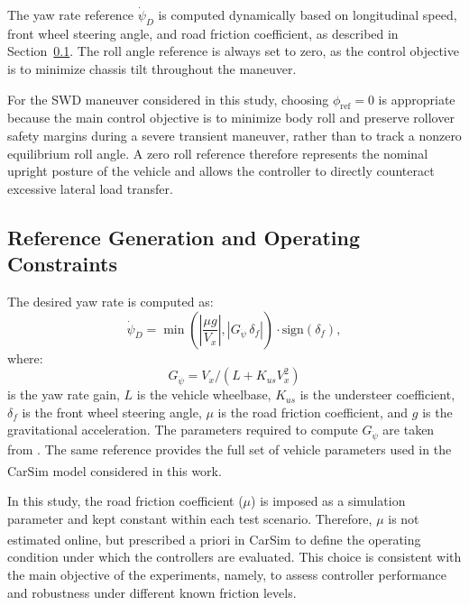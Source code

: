 \documentclass[sn-chicago,iicol]{sn-jnl}
\theoremstyle{thmstyleone}%
\theoremstyle{thmstyletwo}%
\theoremstyle{thmstylethree}%
\begin{document}
The yaw rate reference $\dot{\psi}_D$ is computed dynamically based on 
longitudinal speed, front wheel steering angle, and road friction coefficient, 
as described in Section~\ref{sec:references}. The roll angle reference is 
always set to zero, as the control objective is to minimize chassis tilt 
throughout the maneuver.

For the SWD maneuver considered in this study, choosing $\phi_{\mathrm{ref}} = 0$ is appropriate because the main control objective is to minimize body roll and preserve rollover safety margins during a severe transient maneuver, rather than to track a nonzero equilibrium roll angle. A zero roll reference therefore represents the nominal upright posture of the vehicle and allows the controller to directly counteract excessive lateral load transfer.


\subsection{Reference Generation and Operating 
            Constraints}\label{sec:references}

The desired yaw rate is computed as:
\begin{equation}
    \dot{\psi}_D = \min\left(\left|\frac{\mu g}{V_x}\right|, 
    \left|G_{\dot{\psi}}\,\delta_f\right|\right) 
    \cdot \mathrm{sign}(\delta_f),
    \label{Eq:yaw_ref}
\end{equation}
\noindent where:
\begin{equation}
    G_{\dot{\psi}} = V_x / (L + K_{us} V_x^2)
\end{equation}
\noindent is the yaw rate gain, 
$L$ is the vehicle wheelbase, $K_{us}$ is the understeer coefficient, 
$\delta_f$ is the front wheel steering angle, $\mu$ is the road friction 
coefficient, and $g$ is the gravitational acceleration. The parameters required to compute $G_{\dot{\psi}}$ are taken from \cite{Arronte2023}. The same reference provides the full set of vehicle parameters used in the CarSim\textsuperscript{\textregistered} model considered in this work.

In this study, the road friction coefficient ($\mu$) is imposed as a 
simulation parameter and kept constant within each test scenario. Therefore, 
$\mu$ is not estimated online, but prescribed a priori in 
CarSim\textsuperscript{\textregistered} to define the operating condition 
under which the controllers are evaluated. This choice is consistent with 
the main objective of the experiments, namely, to assess controller 
performance and robustness under different known friction levels.
\end{document}
